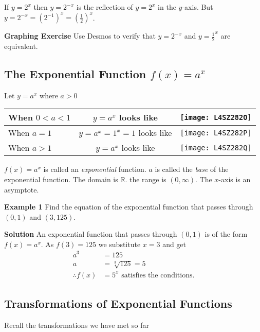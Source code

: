 If $y =2^{x}$ then $y =2^{ -x}$ is the reflection of $y =2^{x}$ in the $y$-axis. But $y =2^{ -x} =\left (2^{ -1}\right )^{x} =\genfrac{(}{)}{}{}{1}{2}^{x}$. 

\textbf{Graphing Exercise} Use Desmos to verify that $y =2^{-x}$ and $y =\frac{1}{2}^x$ are equivalent. 

\subsection*{The Exponential Function $f(x)=a^x$}
Let $y =a^{x}$ where $a >0$ 

\begin{center}
\begin{tabular}{lcl}
	\toprule
	When $0 <a <1$  & $y =a^{x}$ looks like  &    
	\texttt{[image: L4SZ282O]}
	\\
	\midrule
	When $a =1$  & $y =a^{x} =1^{x} =1$ looks like  &    
	\texttt{[image: L4SZ282P]}
	\\
	\midrule
	When $a >1$  & $y =a^{x}$ looks like  &    
\texttt{[image: L4SZ282Q]}
	\\
	\bottomrule
\end{tabular}
\end{center}

$f (x) =a^{x}$ is called an \emph{exponential} function. $a$ is called the \emph{base} of the exponential function. The domain
is $\mathbb{R}$. the range is $\left (0 ,\infty \right )$. The $x$-axis is an asymptote. 

\textbf{Example 1} Find the equation of the exponential function that passes through $\left (0 ,1\right )$ and $\left (3 ,125\right )$. 

\textbf{Solution} An exponential function that passes through $\left (0 ,1\right )$ is of the form $f (x) =a^{x}$. As $f (3) =125$ we substitute $x =3$ and get
\begin{align*}a^{3} &  = 125 \\
a &  = \sqrt[{3}]{125} =5\\
\therefore f(x)&=5^x \text{ satisfies the conditions.}
\end{align*}

\subsection*{Transformations of Exponential Functions}
Recall the transformations we have met so far 

